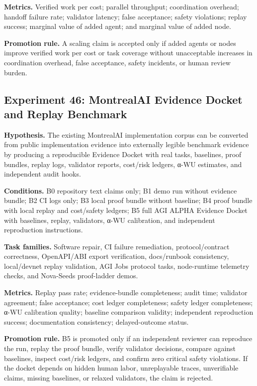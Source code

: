 \documentclass[
  11pt,
]{article}
\begin{document}
\textbf{Metrics.} Verified work per cost; parallel throughput;
coordination overhead; handoff failure rate; validator latency; false
acceptance; safety violations; replay success; marginal value of added
agent; and marginal value of added node.

\textbf{Promotion rule.} A scaling claim is accepted only if added
agents or nodes improve verified work per cost or task coverage without
unacceptable increases in coordination overhead, false acceptance,
safety incidents, or human review burden.

\subsection{Experiment 46: MontrealAI Evidence Docket and Replay
Benchmark}\label{experiment-46-montrealai-evidence-docket-and-replay-benchmark}

\textbf{Hypothesis.} The existing MontrealAI implementation corpus can
be converted from public implementation evidence into externally legible
benchmark evidence by producing a reproducible Evidence Docket with real
tasks, baselines, proof bundles, replay logs, validator reports,
cost/risk ledgers, α-WU estimates, and independent audit hooks.

\textbf{Conditions.} B0 repository text claims only; B1 demo run without
evidence bundle; B2 CI logs only; B3 local proof bundle without
baseline; B4 proof bundle with local replay and cost/safety ledgers; B5
full AGI ALPHA Evidence Docket with baselines, replay, validators, α-WU
calibration, and independent reproduction instructions.

\textbf{Task families.} Software repair, CI failure remediation,
protocol/contract correctness, OpenAPI/ABI export verification,
docs/runbook consistency, local/devnet replay validation, AGI Jobs
protocol tasks, node-runtime telemetry checks, and Nova-Seeds
proof-ladder demos.

\textbf{Metrics.} Replay pass rate; evidence-bundle completeness; audit
time; validator agreement; false acceptance; cost ledger completeness;
safety ledger completeness; α-WU calibration quality; baseline
comparison validity; independent reproduction success; documentation
consistency; delayed-outcome status.

\textbf{Promotion rule.} B5 is promoted only if an independent reviewer
can reproduce the run, replay the proof bundle, verify validator
decisions, compare against baselines, inspect cost/risk ledgers, and
confirm zero critical safety violations. If the docket depends on hidden
human labor, unreplayable traces, unverifiable claims, missing
baselines, or relaxed validators, the claim is rejected.
\end{document}

